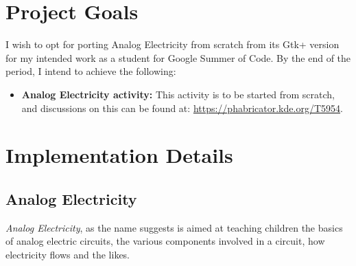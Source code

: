 \documentclass[preprint,12pt]{elsarticle}
\begin{document}
\section{Project Goals}
\label{S:1}
{ I wish to opt for porting Analog Electricity from scratch from its Gtk+ version for my intended work as a student for Google Summer of Code. By the end of the period, I intend to achieve the following:
}
\begin{itemize}
\item \textbf{Analog Electricity activity:} This activity is to be started from scratch, and discussions on this can be found at:  \href{https://phabricator.kde.org/T5954}{https://phabricator.kde.org/T5954}.
\end{itemize}

\section{Implementation Details}
\label{S:1}

	\subsection{Analog Electricity}
	{\textit{Analog Electricity}, as the name suggests is aimed at teaching children the basics of analog electric circuits, the various components involved in a circuit, how electricity flows and the likes.}\\
\end{document}

